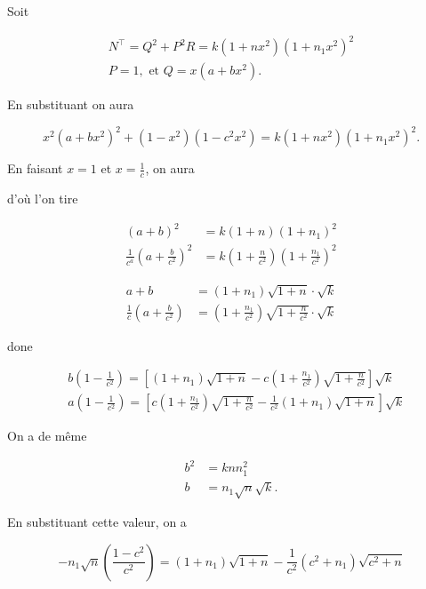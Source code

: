 \documentclass{article}
\begin{document}
Soit

\[
\begin{gathered}
N^{\top}=Q^{2}+P^{2} R=k\left(1+n x^{2}\right)\left(1+n_{1} x^{2}\right)^{2} \\
P=1, \text { et } Q=x\left(a+b x^{2}\right) .
\end{gathered}
\]

En substituant on aura

\[
x^{2}\left(a+b x^{2}\right)^{2}+\left(1-x^{2}\right)\left(1-c^{2} x^{2}\right)=k\left(1+n x^{2}\right)\left(1+n_{1} x^{2}\right)^{2} .
\]

En faisant \(x=1\) et \(x=\frac{1}{c}\), on aura

d'où l'on tire

\[
\begin{aligned}
(a+b)^{2} & =k(1+n)\left(1+n_{1}\right)^{2} \\
\frac{1}{c^{\bar{a}}}\left(a+\frac{b}{c^{2}}\right)^{2} & =k\left(1+\frac{n}{c^{2}}\right)\left(1+\frac{n_{1}}{c^{2}}\right)^{2}
\end{aligned}
\]

\[
\begin{aligned}
a+b & =\left(1+n_{1}\right) \sqrt{1+n} \cdot \sqrt{k} \\
\frac{1}{c}\left(a+\frac{b}{c^{2}}\right) & =\left(1+\frac{n_{1}}{c^{2}}\right) \sqrt{1+\frac{n}{c^{2}}} \cdot \sqrt{k}
\end{aligned}
\]

done

\[
\begin{aligned}
& b\left(1-\frac{1}{c^{2}}\right)=\left[\left(1+n_{1}\right) \sqrt{1+n}-c\left(1+\frac{n_{1}}{c^{2}}\right) \sqrt{1+\frac{n}{c^{2}}}\right] \sqrt{k} \\
& a\left(1-\frac{1}{c^{2}}\right)=\left[c\left(1+\frac{n_{1}}{c^{2}}\right) \sqrt{1+\frac{n}{c^{2}}}-\frac{1}{c^{2}}\left(1+n_{1}\right) \sqrt{1+n}\right] \sqrt{k}
\end{aligned}
\]

On a de même

\[
\begin{aligned}
b^{2} & =k n n_{1}^{2} \\
b & =n_{1} \sqrt{n} \sqrt{k} .
\end{aligned}
\]

En substituant cette valeur, on a

\[
-n_{1} \sqrt{n}\left(\frac{1-c^{2}}{c^{2}}\right)=\left(1+n_{1}\right) \sqrt{1+n}-\frac{1}{c^{2}}\left(c^{2}+n_{1}\right) \sqrt{c^{2}+n}
\]
\end{document}
